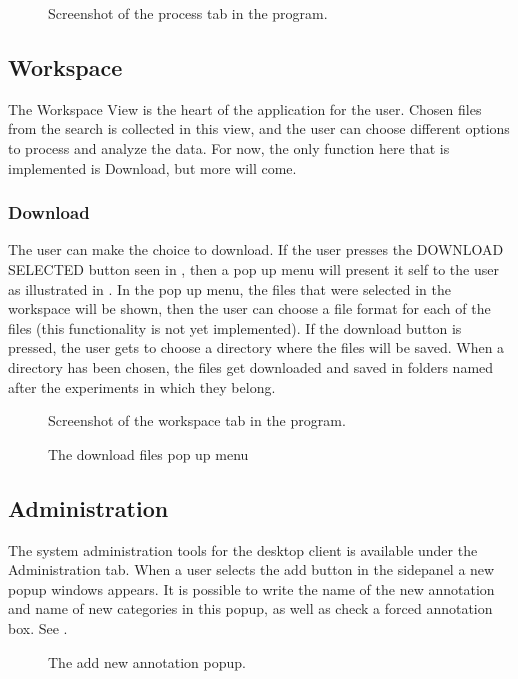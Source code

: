 \begin{figure}[htb]
	\caption{Screenshot of the process tab in the program.}
	\label{fig:des_process-view}
\end{figure}
\FloatBarrier

\subsection{Workspace}
The Workspace View is the heart of the application for the user. Chosen files from the search is collected in this view, and the user can choose different options to process and analyze the data. 
For now, the only function here that is implemented is Download, but more will come.
\subsubsection{Download}
The user can make the choice to download. If the user presses the DOWNLOAD SELECTED button seen in , then a pop up menu will present it self to the user as illustrated in . In the pop up menu, the files that were selected in the workspace will be shown, then the user can choose a file format for each of the files (this functionality is not yet implemented). If the download button is pressed, the user gets to choose a directory where the files will be saved. When a directory has been chosen, the files get downloaded and saved in folders named after the experiments in which they belong. 
\begin{figure}[htb]
	\caption{Screenshot of the workspace tab in the program.}
	\label{fig:des_workspace-view}
\end{figure}
\begin{figure}[htb]
	\caption{The download files pop up menu}
	\label{fig:des_download-view}
\end{figure}
\FloatBarrier

\subsection{Administration}
The system administration tools for the desktop client is available under the Administration tab. When a user selects the add button in the sidepanel a new popup windows appears. It is possible to write the name of the new annotation and name of new categories in this popup, as well as check a forced annotation box. See .
\begin{figure}[h!]
\caption{The add new annotation popup.}
\label{fig:adm_desktopgui}
\end{figure}

